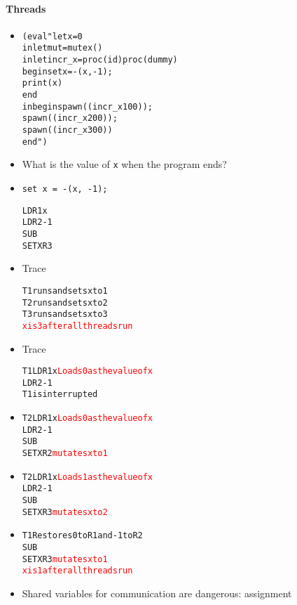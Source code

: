 \documentclass{beamer}
\begin{document}
\begin{frame}[fragile]
\framesubtitle{Threads}
\begin{tiny}
\begin{itemize}
\item<1->
\begin{alltt}
     (eval "let x = 0
            in let mut = mutex()
               in let incr_x = proc (id) proc (dummy)
                                          begin set x = -(x, -1);
                                                print(x)
                                          end
                  in begin spawn((incr_x 100));
                           spawn((incr_x 200));
                           spawn((incr_x 300))
                     end")
\end{alltt}

\item<1-> What is the value of \texttt{x} when the program ends?

\item<2-> \texttt{set x = -(x, -1);}
\begin{alltt}
     LDR1 x
     LDR2 -1
     SUB 
     SET X R3
\end{alltt}

\item<3-> Trace
\begin{alltt}
     T1 runs and sets x to 1
     T2 runs and sets x to 2
     T3 runs and sets x to 3
\textcolor{red}{x is 3 after all threads run}
\end{alltt}

\item<3-> Trace
\begin{alltt}
     T1 LDR1 x  \textcolor{red}{Loads 0 as the value of x}
        LDR2 -1
        T1 is interrupted
\end{alltt}

\item<4->
\begin{alltt}
     T2 LDR1 x    \textcolor{red}{Loads 0 as the value of x}
        LDR2 -1
        SUB
        SET X R2  \textcolor{red}{mutates x to 1}
\end{alltt}

\item<5->
\begin{alltt}
     T2 LDR1 x    \textcolor{red}{Loads 1 as the value of x}
        LDR2 -1
        SUB
        SET X R3  \textcolor{red}{mutates x to 2}
\end{alltt}

\item<6->
\begin{alltt}
     T1 Restores 0 to R1 and -1 to R2
        SUB
        SET X R3  \textcolor{red}{mutates x to 1}
\textcolor{red}{x is 1 after all threads run}
\end{alltt}

\item<6-> Shared variables for communication are dangerous: assignment

\end{itemize}
\end{tiny}
\end{frame}
\end{document}
